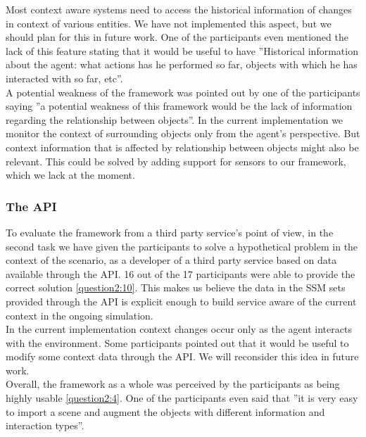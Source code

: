 Most context aware systems need to access the historical information of changes in context of various entities. We have not implemented this aspect, but we should plan for this in future work. One of the participants even mentioned the lack of this feature stating that it would be useful to have ''Historical information about the agent: what actions has he performed so far, objects with which he has interacted with so far, etc''.\\

A potential weakness of the framework was pointed out by one of the participants saying ''a potential weakness of this framework would be the lack of information regarding the relationship between objects''. In the current implementation we monitor the context of surrounding objects only from the agent's perspective. But context information that is affected by relationship between objects might also be relevant. This could be solved by adding support for sensors to our framework, which we lack at the moment.\\

\subsubsection{The API} %
To evaluate the framework from a third party service's point of view, in the second task we have given the participants to solve a hypothetical problem in the context of the scenario, as a developer of a third party service based on data available through the API. 16 out of the 17 participants were able to provide the correct solution \ref{question2:10}. This makes us believe the data in the SSM sets provided through the API is explicit enough to build service aware of the current context in the ongoing simulation.\\

In the current implementation context changes occur only as the agent interacts with the environment. Some participants pointed out that it would be useful to modify some context data through the API. We will reconsider this idea in future work.\\

Overall, the framework as a whole was perceived by the participants as being highly usable \ref{question2:4}. One of the participants even said that ''it is very easy to import a scene and augment the objects with different information and interaction types''.\\


